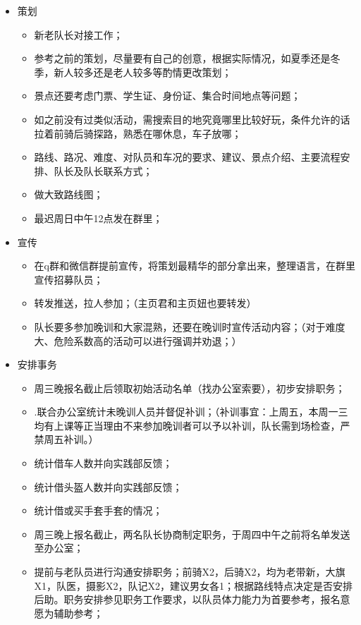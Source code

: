 \documentclass{ctexbook}
\begin{document}
\begin{itemize}
    \item 策划
    \begin{itemize}
        \item 新老队长对接工作；
        \item 参考之前的策划，尽量要有自己的创意，根据实际情况，如夏季还是冬季，新人较多还是老人较多等酌情更改策划；
        \item 景点还要考虑门票、学生证、身份证、集合时间地点等问题；
        \item 如之前没有过类似活动，需搜索目的地究竟哪里比较好玩，条件允许的话拉着前骑后骑探路，熟悉在哪休息，车子放哪；
        \item 路线、路况、难度、对队员和车况的要求、建议、景点介绍、主要流程安排、队长及队长联系方式；
        \item 做大致路线图；    
        \item 最迟周日中午12点发在群里；
    \end{itemize}
    \item 宣传
    \begin{itemize}
        \item 在q群和微信群提前宣传，将策划最精华的部分拿出来，整理语言，在群里宣传招募队员；
        \item 转发推送，拉人参加；（主页君和主页妞也要转发）
        \item 队长要多参加晚训和大家混熟，还要在晚训时宣传活动内容；（对于难度大、危险系数高的活动可以进行强调并劝退；）
    \end{itemize}
    \item 安排事务
    \begin{itemize}
        \item 周三晚报名截止后领取初始活动名单（找办公室索要），初步安排职务；
        \item .联合办公室统计未晚训人员并督促补训；（补训事宜：上周五，本周一三均有上课等正当理由不来参加晚训者可以予以补训，队长需到场检查，严禁周五补训。）
        \item 统计借车人数并向实践部反馈；
        \item 统计借头盔人数并向实践部反馈；
        \item 统计借或买手套手套的情况；
        \item 周三晚上报名截止，两名队长协商制定职务，于周四中午之前将名单发送至办公室；
        \item 提前与老队员进行沟通安排职务；前骑X2，后骑X2，均为老带新，大旗X1，队医，摄影X2，队记X2，建议男女各1；根据路线特点决定是否安排后助。职务安排参见职务工作要求，以队员体力能力为首要参考，报名意愿为辅助参考；
    \end{itemize}


\end{itemize}
\end{document}
